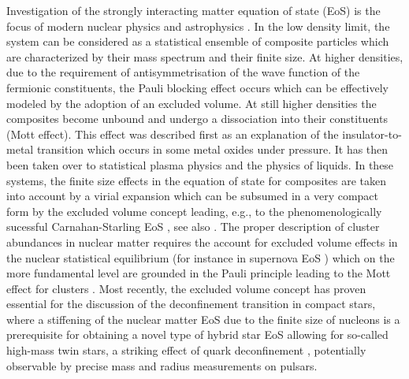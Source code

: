 \documentclass[12pt]{article}
\begin{document}
Investigation of the strongly interacting matter equation of state (EoS)  is  the focus of modern nuclear physics and astrophysics \cite{GenRevEOS,Haensel:2007yy}. 
In the low density limit, the system can be considered as a statistical ensemble of composite particles which are characterized by their mass spectrum and their finite size. 
At higher densities, due to the requirement of antisymmetrisation of the wave function of the fermionic constituents, the Pauli blocking effect occurs which can be effectively modeled by the adoption of an  excluded volume. 
At still higher densities the composites become unbound and undergo a dissociation into their constituents
(Mott effect). 
This effect was described first as an explanation of the insulator-to-metal transition \cite{Mott:1974} which occurs in some metal oxides under pressure. 
It has then been taken over to statistical plasma physics and the physics of liquids.
In these systems, the finite size effects in the equation of state for composites are taken into account by a virial expansion which can be subsumed in a very compact form by the excluded volume concept leading, e.g., to the phenomenologically sucessful Carnahan-Starling EoS \cite{CSeos}, see also
\cite{Ebeling:2008mg,EbelingMottBook}.
The proper description of cluster abundances in nuclear matter requires the account for excluded volume 
effects in the nuclear statistical equilibrium (for instance in supernova EoS 
\cite{Lattimer:1991nc,Shen:1998gq})  
which on the more fundamental level are grounded in the Pauli principle leading to the Mott effect for clusters \cite{Typel:2009sy}.
Most recently, the excluded volume concept has proven essential for the discussion of the deconfinement transition in compact stars, where a stiffening of the nuclear matter EoS due to the finite size of nucleons is
a prerequisite for obtaining a novel type of hybrid star EoS allowing for so-called high-mass twin stars, a 
striking effect of quark deconfinement \cite{Benic:2014jia}, potentially observable by precise mass and radius measurements on pulsars. 
\end{document}
